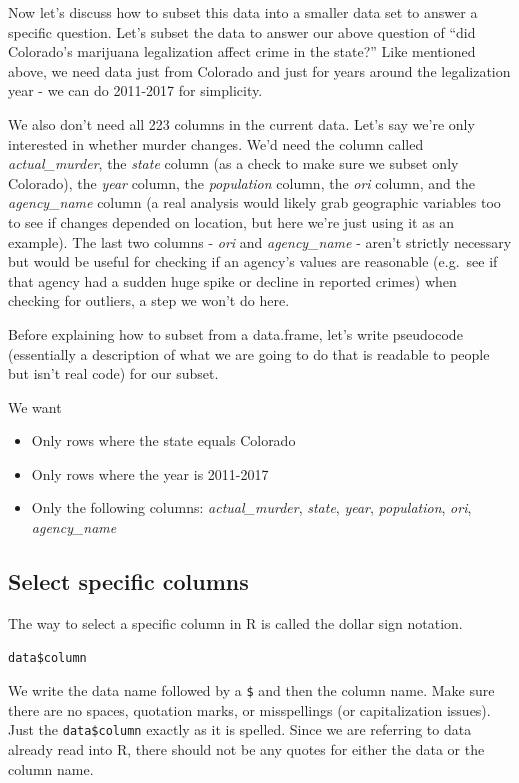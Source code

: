 \documentclass[
]{krantz}
\providecommand{\tightlist}{%
  \setlength{\itemsep}{0pt}\setlength{\parskip}{0pt}}
\begin{document}
Now let's discuss how to subset this data into a smaller
data set to answer a specific question. Let's subset the
data to answer our above question of ``did Colorado's
marijuana legalization affect crime in the state?'' Like
mentioned above, we need data just from Colorado and just
for years around the legalization year - we can do 2011-2017
for simplicity.

We also don't need all 223 columns in the current data.
Let's say we're only interested in whether murder changes.
We'd need the column called \emph{actual\_murder}, the
\emph{state} column (as a check to make sure we subset only
Colorado), the \emph{year} column, the \emph{population}
column, the \emph{ori} column, and the \emph{agency\_name}
column (a real analysis would likely grab geographic
variables too to see if changes depended on location, but
here we're just using it as an example). The last two
columns - \emph{ori} and \emph{agency\_name} - aren't
strictly necessary but would be useful for checking if an
agency's values are reasonable (e.g.~see if that agency had
a sudden huge spike or decline in reported crimes) when
checking for outliers, a step we won't do here.

Before explaining how to subset from a data.frame, let's
write pseudocode (essentially a description of what we are
going to do that is readable to people but isn't real code)
for our subset.

We want

\begin{itemize}
\tightlist
\item
  Only rows where the state equals Colorado
\item
  Only rows where the year is 2011-2017
\item
  Only the following columns: \emph{actual\_murder},
  \emph{state}, \emph{year}, \emph{population}, \emph{ori},
  \emph{agency\_name}
\end{itemize}

\hypertarget{select-specific-columns}{%
\subsection{Select specific
columns}\label{select-specific-columns}}

The way to select a specific column in R is called the
dollar sign notation.

\texttt{data\$column}

We write the data name followed by a \texttt{\$} and then
the column name. Make sure there are no spaces, quotation
marks, or misspellings (or capitalization issues). Just the
\texttt{data\$column} exactly as it is spelled. Since we are
referring to data already read into R, there should not be
any quotes for either the data or the column name.
\end{document}
